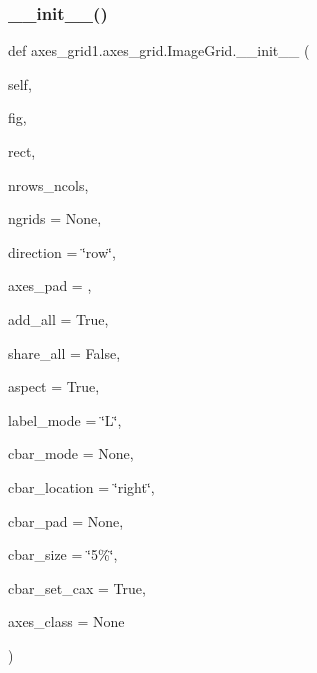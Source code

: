 \subsubsection{\texorpdfstring{\+\_\+\+\_\+init\+\_\+\+\_\+()}{\_\_init\_\_()}}
{\footnotesize\ttfamily def axes\+\_\+grid1.\+axes\+\_\+grid.\+Image\+Grid.\+\_\+\+\_\+init\+\_\+\+\_\+ (\begin{DoxyParamCaption}\item[{}]{self,  }\item[{}]{fig,  }\item[{}]{rect,  }\item[{}]{nrows\+\_\+ncols,  }\item[{}]{ngrids = {\ttfamily None},  }\item[{}]{direction = {\ttfamily \char`\"{}row\char`\"{}},  }\item[{}]{axes\+\_\+pad = {},  }\item[{}]{add\+\_\+all = {\ttfamily True},  }\item[{}]{share\+\_\+all = {\ttfamily False},  }\item[{}]{aspect = {\ttfamily True},  }\item[{}]{label\+\_\+mode = {\ttfamily \char`\"{}L\char`\"{}},  }\item[{}]{cbar\+\_\+mode = {\ttfamily None},  }\item[{}]{cbar\+\_\+location = {\ttfamily \char`\"{}right\char`\"{}},  }\item[{}]{cbar\+\_\+pad = {\ttfamily None},  }\item[{}]{cbar\+\_\+size = {\ttfamily \char`\"{}5\%\char`\"{}},  }\item[{}]{cbar\+\_\+set\+\_\+cax = {\ttfamily True},  }\item[{}]{axes\+\_\+class = {\ttfamily None} }\end{DoxyParamCaption})}

